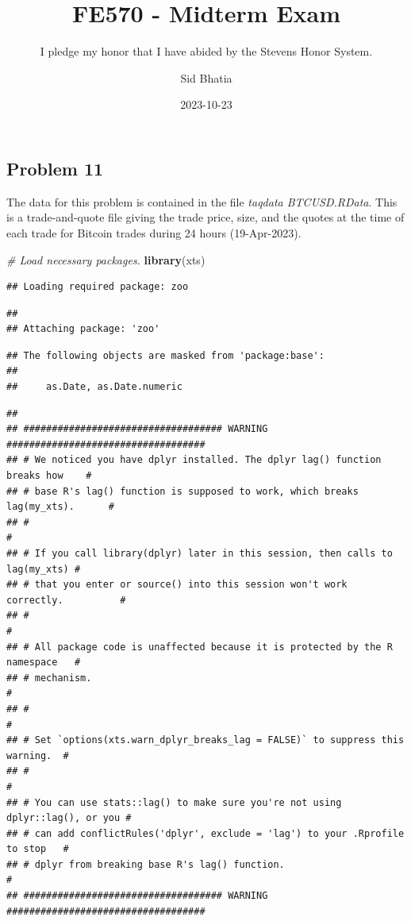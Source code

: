 \documentclass[
]{article}
\title{FE570 - Midterm Exam}
\subtitle{I pledge my honor that I have abided by the Stevens Honor
System.}
\author{Sid Bhatia}
\date{2023-10-23}
\newenvironment{Shaded}{\begin{snugshade}}{\end{snugshade}}
\newcommand{\CommentTok}[1]{\textcolor[rgb]{0.56,0.35,0.01}{\textit{#1}}}
\newcommand{\FunctionTok}[1]{\textcolor[rgb]{0.13,0.29,0.53}{\textbf{#1}}}
\newcommand{\NormalTok}[1]{#1}
\begin{document}
\maketitle

\subsection{Problem 11}\label{problem-11}

The data for this problem is contained in the file \emph{taqdata
BTCUSD.RData}. This is a trade-and-quote file giving the trade price,
size, and the quotes at the time of each trade for Bitcoin trades during
24 hours (19-Apr-2023).

\begin{Shaded}
\begin{Highlighting}[]
\CommentTok{\# Load necessary packages.}
\FunctionTok{library}\NormalTok{(xts)}
\end{Highlighting}
\end{Shaded}

\begin{verbatim}
## Loading required package: zoo
\end{verbatim}

\begin{verbatim}
## 
## Attaching package: 'zoo'
\end{verbatim}

\begin{verbatim}
## The following objects are masked from 'package:base':
## 
##     as.Date, as.Date.numeric
\end{verbatim}

\begin{verbatim}
## 
## ################################### WARNING ###################################
## # We noticed you have dplyr installed. The dplyr lag() function breaks how    #
## # base R's lag() function is supposed to work, which breaks lag(my_xts).      #
## #                                                                             #
## # If you call library(dplyr) later in this session, then calls to lag(my_xts) #
## # that you enter or source() into this session won't work correctly.          #
## #                                                                             #
## # All package code is unaffected because it is protected by the R namespace   #
## # mechanism.                                                                  #
## #                                                                             #
## # Set `options(xts.warn_dplyr_breaks_lag = FALSE)` to suppress this warning.  #
## #                                                                             #
## # You can use stats::lag() to make sure you're not using dplyr::lag(), or you #
## # can add conflictRules('dplyr', exclude = 'lag') to your .Rprofile to stop   #
## # dplyr from breaking base R's lag() function.                                #
## ################################### WARNING ###################################
\end{verbatim}
\end{document}
